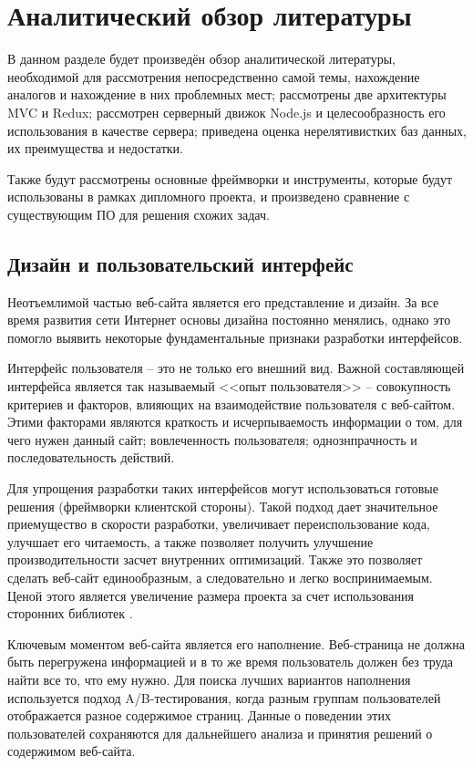 \section{Аналитический обзор литературы}
\label{sec:domain}

В данном разделе будет произведён обзор аналитической литературы, необходимой для рассмотрения непосредственно самой темы, нахождение аналогов и нахождение в них проблемных мест; рассмотрены две архитектуры MVC и Redux; рассмотрен серверный движок Node.js и целесообразность его использования в качестве сервера; приведена оценка нерелятивистких баз данных, их преимущества и недостатки.

Также будут рассмотрены основные фреймворки и инструменты, которые будут использованы в рамках дипломного проекта, и произведено сравнение с существующим ПО для решения схожих задач.

\subsection{Дизайн и пользовательский интерфейс}
\label{sub:domain:bayes_net}
Неотъемлимой частью веб-сайта является его представление и дизайн. За все время развития сети Интернет основы дизайна постоянно менялись, однако это помогло выявить некоторые фундаментальные признаки разработки интерфейсов.

Интерфейс пользователя -- это не только его внешний вид. Важной составляющей интерфейса является так называемый <<опыт пользователя>> -- совокупность критериев и факторов, влияющих на взаимодействие пользователя с веб-сайтом. Этими факторами являются краткость и исчерпываемость информации о том, для чего нужен данный сайт; вовлеченность пользователя; однознпрачность и последовательность действий.

Для упрощения разработки таких интерфейсов могут использоваться готовые решения (фреймворки клиентской стороны). Такой подход дает значительное приемущество в скорости разработки, увеличивает переиспользование кода, улучшает его читаемость, а также позволяет получить улучшение производительности засчет внутренних оптимизаций. Также это позволяет сделать веб-сайт единообразным, а следовательно и легко воспринимаемым. Ценой этого является увеличение размера проекта за счет использования сторонних библиотек \cite{framework}.

Ключевым моментом веб-сайта является его наполнение. Веб-страница не должна быть перегружена информацией и в то же время пользователь должен без труда найти все то, что ему нужно. Для поиска лучших вариантов наполнения используется подход A/B-тестирования, когда разным группам пользователей отображается разное содержимое страниц. Данные о поведении этих пользователей сохраняются для дальнейшего анализа и принятия решений о содержимом веб-сайта.

